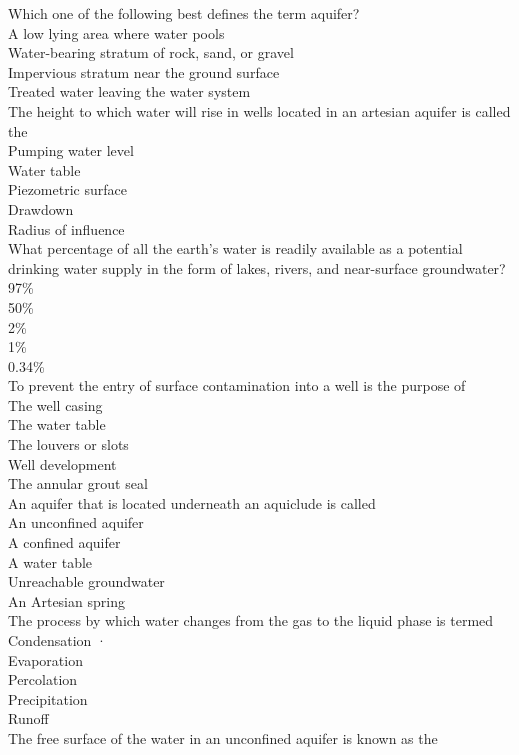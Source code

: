 Which one of the following best defines the term aquifer?\\
A low lying area where water pools\\
Water-bearing stratum of rock, sand, or gravel\\
Impervious stratum near the ground surface\\
Treated water leaving the water system\\
The height to which water will rise in wells located in an artesian aquifer is called the\\
Pumping water level\\
Water table\\
Piezometric surface\\
Drawdown\\
Radius of influence\\
What percentage of all the earth's water is readily available as a potential drinking water supply in the form of lakes, rivers, and near-surface groundwater?\\
97\%\\
50\%\\
2\%\\
1\%\\
0.34\%\\
To  prevent the entry of surface contamination into a well is the purpose of\\
The well casing\\
The water table\\
The louvers or slots\\
Well development\\
The  annular grout seal	\\
An aquifer that is located underneath an aquiclude is called\\
An unconfined aquifer\\
A confined aquifer\\
A water table\\
Unreachable groundwater\\
An Artesian spring\\
The process by which water changes from the gas to the liquid phase is termed\\
Condensation	·\\
Evaporation\\
Percolation\\
Precipitation\\
Runoff\\
The free surface of the water in an unconfined aquifer is known as the\\
